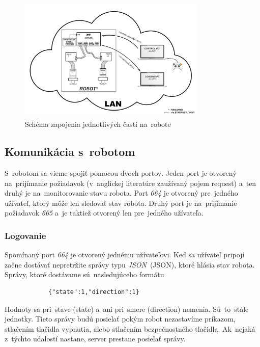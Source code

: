 \clearpage

\begin{figure}[!htbp]
	\begin{center}
		\includegraphics[width=9cm]{img/schemaRobota.png}
	\end{center}
	\caption{Schéma zapojenia jednotlivých častí na~robote \cite{timovyProjekt}}
	\label{fig:schemaRobota}
\end{figure}

\subsection{Komunikácia s~robotom}
\label{subsec:komunikacia}

S~robotom sa vieme spojiť pomocou dvoch portov. Jeden port je otvorený na~prijímanie požiadavok (v~anglickej
literatúre zaužívaný pojem request) a~ten druhý je na~monitorovanie stavu robota. Port \textit{664} je otvorený
pre~jedného užívateľ, ktorý môže len sledovať stav robota. Druhý port je na~prijímanie požiadavok \textit{665}
a~je taktiež otvorený len pre~jedného užívateľa.

\subsubsection{Logovanie}
\label{sec:logovanie}

	Spomínaný port \textit{664} je otvorený jednému užívateľovi. Keď sa užívateľ pripojí začne dostávať nepretržite
	správy typu \textit{JSON}~(\acrlong{JSON}), ktoré hlásia stav robota. Správy, ktoré dostávame sú~nasledujúceho
	formátu

	\begin{lstlisting}
			{"state":1,"direction":1}
	\end{lstlisting}

	Hodnoty sa pri~stave (state) a~ani pri~smere (direction) nemenia. Sú~to~stále jednotky. Tieto správy budú
	posielať pokým robot nezastavíme príkazom, stlačením tlačidla vypnutia, alebo stlačením bezpečnostného
	tlačidla. Ak~nejaká z~týchto udalostí nastane, server prestane posielať správy.

